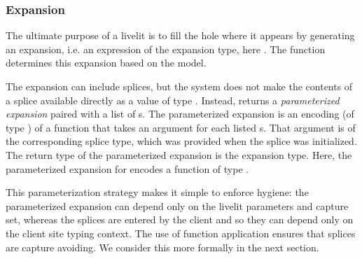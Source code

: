 \subsubsection{Expansion}
\label{sec:expansion}
The ultimate purpose of a livelit is to fill the hole where it appears by generating an expansion,
i.e. an expression of the expansion type, here .
The  function determines this expansion based on the model.

The expansion can include splices, but the system does not make the contents of a splice 
available directly as a value of type . Instead,  returns a \emph{parameterized expansion}
paired with a list of s. 
The {parameterized expansion}
 is an encoding (of type ) of a function 
 that takes an argument for each listed s. 
 That argument is of the corresponding splice 
type, which was provided when the splice was initialized. 
 The return type of the parameterized expansion is the expansion type.
 Here, the parameterized expansion for  encodes a function of type 
 .

This parameterization strategy makes it simple to enforce hygiene: the parameterized expansion 
can depend only on the livelit parameters and capture set, whereas the splices are entered by the client and so they can 
depend only on the client site typing context. The use of function application ensures
that splices are capture avoiding. We consider this more formally in the next section.
